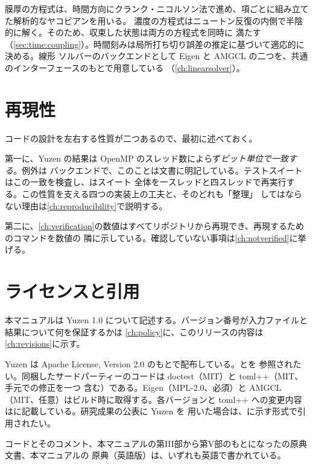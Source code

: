 膜厚の方程式は、時間方向にクランク・ニコルソン法で進め、項ごとに組み立てた解析的なヤコビアンを用いる。
濃度の方程式はニュートン反復の内側で半陰的に解く。そのため、収束した状態は両方の方程式を同時に
満たす（\cref{sec:time:coupling}）。時間刻みは局所打ち切り誤差の推定に基づいて適応的に決める。線形
ソルバーのバックエンドとして Eigen と AMGCL の二つを、共通のインターフェースのもとで用意している
（\cref{ch:linearsolver}）。

\section{再現性}
\label{sec:intro:repro}

コードの設計を左右する性質が二つあるので、最初に述べておく。

第一に、Yuzen の結果は OpenMP のスレッド数によらず\emph{ビット単位で一致する}。例外は
バックエンドで、このことは文書に明記している。テストスイートはこの一致を検査し、はスイート
全体を一スレッドと四スレッドで再実行する。この性質を支える四つの実装上の工夫と、そのどれも「整理」
してはならない理由は\cref{ch:reproducibility}で説明する。

第二に、\cref{ch:verification}の数値はすべてリポジトリから再現でき、再現するためのコマンドを数値の
隣に示している。確認していない事項は\cref{ch:notverified}に挙げる。

\section{ライセンスと引用}
\label{sec:intro:license}

本マニュアルは Yuzen 1.0 について記述する。バージョン番号が入力ファイルと結果について何を保証するかは
\cref{ch:policy}に、このリリースの内容は\cref{ch:revisions}に示す。

Yuzen は Apache License, Version 2.0 のもとで配布している。とを
参照されたい。同梱したサードパーティーのコードは doctest（MIT）と toml++（MIT、手元での修正を一つ
含む）である。Eigen（MPL-2.0、必須）と AMGCL（MIT、任意）はビルド時に取得する。各バージョンと
toml++ への変更内容はに記載している。研究成果の公表に Yuzen を
用いた場合は、に示す形式で引用されたい。

コードとそのコメント、本マニュアルの第III部から第V部のもとになったの原典文書、本マニュアルの
原典（英語版）は、いずれも英語で書かれている。
